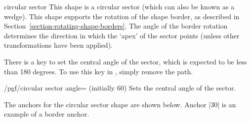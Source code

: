 \begin{shape}{circular sector}
    This shape is a circular sector (which can also be known as a wedge). This
    shape supports the rotation of the shape border, as described in
    Section~\ref{section-rotating-shape-borders}. The angle of the border
    rotation determines the direction in which the `apex' of the sector points
    (unless other transformations have been applied).
\begin{codeexample}[preamble={\usetikzlibrary{shapes.geometric}}]
\end{codeexample}

    There is a \pgfname{} key to set the central angle of the sector, which is
    expected to be less than 180 degrees. To use this key in \tikzname, simply
    remove the  path.

    \begin{key}{/pgf/circular sector angle= (initially 60)}
        Sets the central angle of the sector.
    \end{key}

    The anchors for the circular sector shape are shown below. Anchor |30| is
    an example of a border anchor.
\begin{codeexample}[preamble={\usetikzlibrary{shapes.geometric}}]
\Huge
{}
\end{codeexample}
\end{shape}

